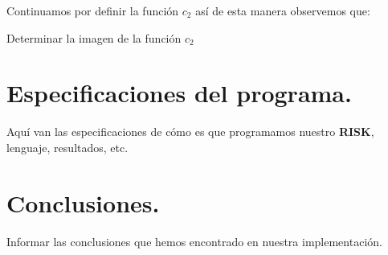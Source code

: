 \documentclass[12pt,twocolumn,draft]{article}
\begin{document}
Continuamos por definir la funci\'on $c_{2}$ as\'i de esta manera observemos que:\\

\begin{algorithm}
\begin{algorithmic}[1]
\ENSURE Determinar la imagen de la funci\'on $c_{2}$
\ENDIF
\ENDFOR


\end{algorithmic}
\caption{Definici\'on de la funci\'on $c_{2}$}
\label{c2}
\end{algorithm}

\section{Especificaciones del programa.}
Aqu\'i van las especificaciones de c\'omo es que programamos nuestro \textbf{RISK}, lenguaje, resultados, etc.

\section{Conclusiones.}
Informar las conclusiones que hemos encontrado en nuestra implementaci\'on. \cite{2personGT}


\newpage
	
{}
\end{document}
